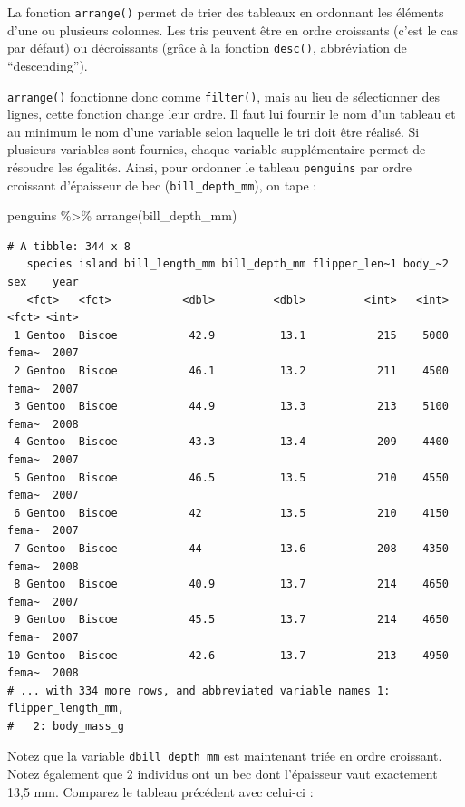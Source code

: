 \documentclass[
  letterpaper,
  DIV=11,
  numbers=noendperiod]{scrreprt}
\newenvironment{Shaded}{\begin{snugshade}}{\end{snugshade}}
\newcommand{\FunctionTok}[1]{\textcolor[rgb]{0.28,0.35,0.67}{#1}}
\newcommand{\NormalTok}[1]{\textcolor[rgb]{0.00,0.23,0.31}{#1}}
\newcommand{\SpecialCharTok}[1]{\textcolor[rgb]{0.37,0.37,0.37}{#1}}
\begin{document}
La fonction \texttt{arrange()} permet de trier des tableaux en ordonnant
les éléments d'une ou plusieurs colonnes. Les tris peuvent être en ordre
croissants (c'est le cas par défaut) ou décroissants (grâce à la
fonction \texttt{desc()}, abbréviation de ``descending'').

\texttt{arrange()} fonctionne donc comme \texttt{filter()}, mais au lieu
de sélectionner des lignes, cette fonction change leur ordre. Il faut
lui fournir le nom d'un tableau et au minimum le nom d'une variable
selon laquelle le tri doit être réalisé. Si plusieurs variables sont
fournies, chaque variable supplémentaire permet de résoudre les
égalités. Ainsi, pour ordonner le tableau \texttt{penguins} par ordre
croissant d'épaisseur de bec (\texttt{bill\_depth\_mm}), on tape :

\begin{Shaded}
\begin{Highlighting}[]
\NormalTok{penguins }\SpecialCharTok{\%\textgreater{}\%}
  \FunctionTok{arrange}\NormalTok{(bill\_depth\_mm)}
\end{Highlighting}
\end{Shaded}

\begin{verbatim}
# A tibble: 344 x 8
   species island bill_length_mm bill_depth_mm flipper_len~1 body_~2 sex    year
   <fct>   <fct>           <dbl>         <dbl>         <int>   <int> <fct> <int>
 1 Gentoo  Biscoe           42.9          13.1           215    5000 fema~  2007
 2 Gentoo  Biscoe           46.1          13.2           211    4500 fema~  2007
 3 Gentoo  Biscoe           44.9          13.3           213    5100 fema~  2008
 4 Gentoo  Biscoe           43.3          13.4           209    4400 fema~  2007
 5 Gentoo  Biscoe           46.5          13.5           210    4550 fema~  2007
 6 Gentoo  Biscoe           42            13.5           210    4150 fema~  2007
 7 Gentoo  Biscoe           44            13.6           208    4350 fema~  2008
 8 Gentoo  Biscoe           40.9          13.7           214    4650 fema~  2007
 9 Gentoo  Biscoe           45.5          13.7           214    4650 fema~  2007
10 Gentoo  Biscoe           42.6          13.7           213    4950 fema~  2008
# ... with 334 more rows, and abbreviated variable names 1: flipper_length_mm,
#   2: body_mass_g
\end{verbatim}

Notez que la variable \texttt{dbill\_depth\_mm} est maintenant triée en
ordre croissant. Notez également que 2 individus ont un bec dont
l'épaisseur vaut exactement 13,5 mm. Comparez le tableau précédent avec
celui-ci :
\end{document}
